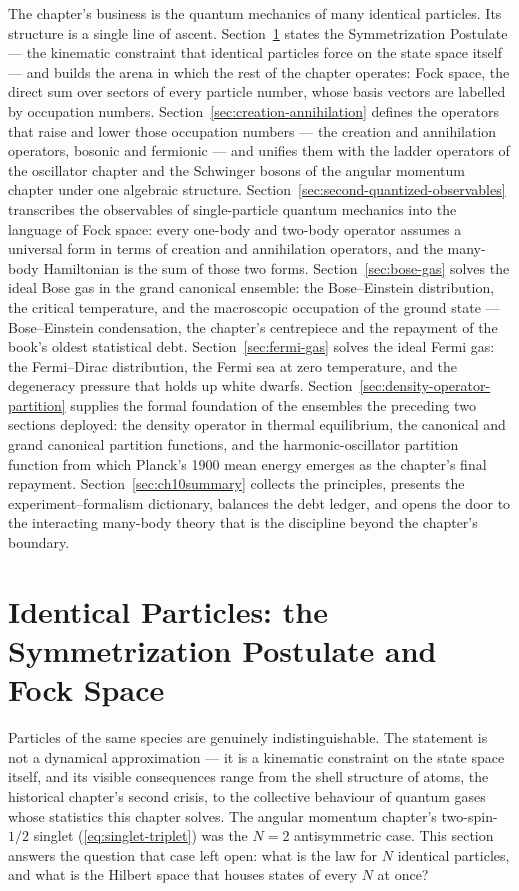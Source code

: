 The chapter's business is the quantum mechanics of many identical particles. Its structure is a single line of ascent. Section~\ref{sec:identical-particles} states the Symmetrization Postulate --- the kinematic constraint that identical particles force on the state space itself --- and builds the arena in which the rest of the chapter operates: Fock space, the direct sum over sectors of every particle number, whose basis vectors are labelled by occupation numbers. Section~\ref{sec:creation-annihilation} defines the operators that raise and lower those occupation numbers --- the creation and annihilation operators, bosonic and fermionic --- and unifies them with the ladder operators of the oscillator chapter and the Schwinger bosons of the angular momentum chapter under one algebraic structure. Section~\ref{sec:second-quantized-observables} transcribes the observables of single-particle quantum mechanics into the language of Fock space: every one-body and two-body operator assumes a universal form in terms of creation and annihilation operators, and the many-body Hamiltonian is the sum of those two forms. Section~\ref{sec:bose-gas} solves the ideal Bose gas in the grand canonical ensemble: the Bose--Einstein distribution, the critical temperature, and the macroscopic occupation of the ground state --- Bose--Einstein condensation, the chapter's centrepiece and the repayment of the book's oldest statistical debt. Section~\ref{sec:fermi-gas} solves the ideal Fermi gas: the Fermi--Dirac distribution, the Fermi sea at zero temperature, and the degeneracy pressure that holds up white dwarfs. Section~\ref{sec:density-operator-partition} supplies the formal foundation of the ensembles the preceding two sections deployed: the density operator in thermal equilibrium, the canonical and grand canonical partition functions, and the harmonic-oscillator partition function from which Planck's 1900 mean energy emerges as the chapter's final repayment. Section~\ref{sec:ch10summary} collects the principles, presents the experiment--formalism dictionary, balances the debt ledger, and opens the door to the interacting many-body theory that is the discipline beyond the chapter's boundary.

\section{Identical Particles: the Symmetrization Postulate and Fock Space}
\label{sec:identical-particles}

Particles of the same species are genuinely indistinguishable. The statement is not a dynamical approximation --- it is a kinematic constraint on the state space itself, and its visible consequences range from the shell structure of atoms, the historical chapter's second crisis, to the collective behaviour of quantum gases whose statistics this chapter solves. The angular momentum chapter's two-spin-$1/2$ singlet (\eqref{eq:singlet-triplet}) was the $N=2$ antisymmetric case. This section answers the question that case left open: what is the law for $N$ identical particles, and what is the Hilbert space that houses states of every $N$ at once?

